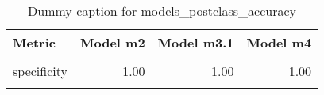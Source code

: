 \begin{table}
\centering
\caption{Dummy caption for models_postclass_accuracy}
\centering
\fontsize{10}{12}\selectfont
\begin{tabular}[t]{lrrr}
\toprule
Metric & Model m2 & Model m3.1 & Model m4\\
\midrule
\cellcolor{gray!10}{sensitivity} & \cellcolor{gray!10}{0.46} & \cellcolor{gray!10}{0.46} & \cellcolor{gray!10}{0.46}\\
specificity & 1.00 & 1.00 & 1.00\\
\cellcolor{gray!10}{overall\_accuracy} & \cellcolor{gray!10}{0.90} & \cellcolor{gray!10}{0.90} & \cellcolor{gray!10}{0.90}\\
\bottomrule
\end{tabular}
\end{table}
